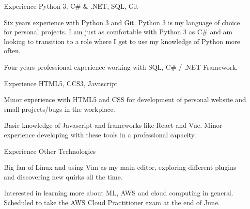 \begin{cventries}
  \cventry
    {Experience}
    {Python 3, C\# \& .NET, SQL, Git}
    {}
    {}
    {
      \begin{cvitems}
		  \item Six years experience with Python 3 and Git. Python 3 is my language of choice for personal projects. I am just as comfortable with Python 3 as C\# and am looking to transition to a role where I get to use my knowledge of Python more often.
		  \item Four years professional experience working with SQL, C\# / .NET Framework.
      \end{cvitems}
    }
  \cventry
    {Experience}
    {HTML5, CCS3, Javascript}
    {}
    {}
    {
      \begin{cvitems}
	      \item Minor experience with HTML5 and CSS for development of personal website and small projects/bugs in the workplace.
		  \item Basic knowledge of Javascript and frameworks like React and Vue. Minor experience developing with these tools in a professional capacity.
      \end{cvitems}
    }
  \cventry
    {Experience}
    {Other Technologies}
    {}
    {}
    {
      \begin{cvitems}
	      \item Big fan of Linux and using Vim as my main editor, exploring different plugins and discovering new quirks all the time.
		  \item Interested in learning more about ML, AWS and cloud computing in general. Scheduled to take the AWS Cloud Practitioner exam at the end of June.
      \end{cvitems}
    }
\vspace*{-2pt}
\end{cventries}

